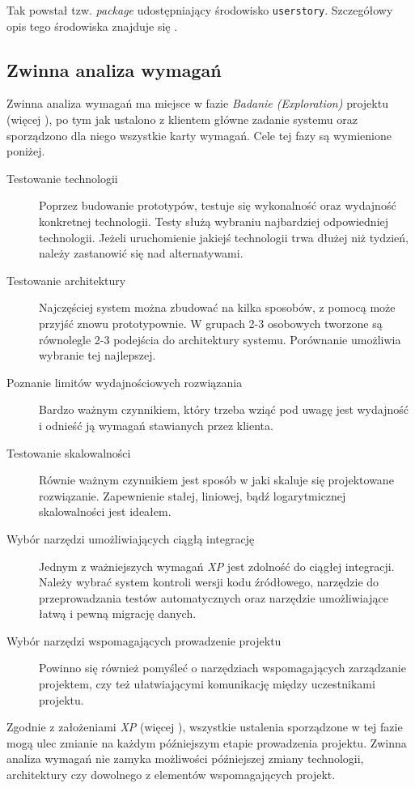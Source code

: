 Tak powstał tzw. \textit{package} udostępniający środowisko \texttt{userstory}. Szczegółowy opis tego środowiska znajduje się .

\subsection{Zwinna analiza wymagań}
\label{sec:ZMTOzwinnaAnalizaWymagan}

Zwinna analiza wymagań ma miejsce w fazie \textit{Badanie (Exploration)} projektu (więcej ), po tym jak ustalono z klientem główne zadanie systemu oraz sporządzono dla niego wszystkie karty wymagań. Cele tej fazy są wymienione poniżej.

\begin{description}
    \item[Testowanie technologii]{Poprzez budowanie prototypów, testuje się wykonalność oraz wydajność konkretnej technologii. Testy służą wybraniu najbardziej odpowiedniej technologii. Jeżeli uruchomienie jakiejś technologii trwa dłużej niż tydzień, należy zastanowić się nad alternatywami.}
    \item[Testowanie architektury]{Najczęściej system można zbudować na kilka sposobów, z pomocą może przyjść znowu prototypownie. W grupach 2-3 osobowych tworzone są równolegle 2-3 podejścia do architektury systemu. Porównanie umożliwia wybranie tej najlepszej.}
    \item[Poznanie limitów wydajnościowych rozwiązania]{Bardzo ważnym czynnikiem, który trzeba wziąć pod uwagę jest wydajność i odnieść ją wymagań stawianych przez klienta.}
    \item[Testowanie skalowalności]{Równie ważnym czynnikiem jest sposób w jaki skaluje się projektowane rozwiązanie. Zapewnienie stałej, liniowej, bądź logarytmicznej skalowalności jest ideałem.}
    \item[Wybór narzędzi umożliwiających ciągłą integrację]{Jednym z ważniejszych wymagań \textit{XP} jest zdolność do ciągłej integracji. Należy wybrać system kontroli wersji kodu źródłowego, narzędzie do przeprowadzania testów automatycznych oraz narzędzie umożliwiające łatwą i pewną migrację danych.}
    \item[Wybór narzędzi wspomagających prowadzenie projektu]{Powinno się również pomyśleć o narzędziach wspomagających zarządzanie projektem, czy też ułatwiającymi komunikację między uczestnikami projektu.}
\end{description}

Zgodnie z założeniami \textit{XP} (więcej ), wszystkie ustalenia sporządzone w tej fazie mogą ulec zmianie na każdym późniejszym etapie prowadzenia projektu. Zwinna analiza wymagań nie zamyka możliwości późniejszej zmiany technologii, architektury czy dowolnego z elementów wspomagających projekt.

\newpage
